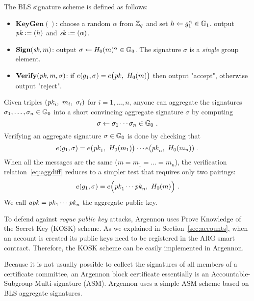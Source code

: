 The BLS signature scheme is defined as follows:

\begin{itemize}
    \item $\textbf{KeyGen}()$: choose a random $\alpha$ from $\mathbb{Z}_q$ and set $h \gets g_1^\alpha \in \mathbb{G}_1$.
    output $\mathit{pk} \mathrel{\mathop:}= (h)$ and $\mathit{sk} \mathrel{\mathop:}= (\alpha)$.
    \item $\textbf{Sign}(\mathit{sk}, m)$: output $\sigma \gets H_0(m)^\alpha \in \mathbb{G}_0$.
    The signature $\sigma$ is a \emph{single} group element.
    \item $\textbf{Verify}(\mathit{pk},m,\sigma)$: if $e(g_1, \sigma) = e\big(\PK,\ \Hm(m)\big)$  then output "accept",
    otherwise output "reject".
\end{itemize}

Given triples $(\PK_i,\ m_i,\ \sigma_i)$ for $i=1,\ldots,n$,
anyone can aggregate the signatures $\sigma_1,\ldots,\sigma_n \in \mathbb{G}_0$
into a short convincing aggregate signature $\sigma$ by computing
\begin{equation}
    \label{eq:agg}
    \sigma \gets \sigma_1 \cdots \sigma_n \in \mathbb{G}_0\ .
\end{equation}
Verifying an aggregate signature $\sigma \in \mathbb{G}_0$ is done by checking that
\begin{equation}
    \label{eq:aggdiff}
    e(g_1, \sigma) = e\big(\PK_1,\ \Hm(m_1)\big) \cdots e\big(\PK_n,\ \Hm(m_n)\big)\ .
\end{equation}
When all the messages are the same ($m = m_1 = \ldots = m_n$), the verification relation~\eqref{eq:aggdiff} reduces to
a simpler test that requires only two pairings:
\begin{equation}
    \label{eq:aggsame}
    e(g_1, \sigma) = e\Big(\mathit{pk}_1 \cdots \mathit{pk}_n,\ H_0(m)\Big)\ .
\end{equation}
We call $\mathit{apk}=\mathit{pk}_1 \cdots \mathit{pk}_n$ the aggregate public key.

To defend against \emph{rogue public key} attacks, Argennon uses Prove Knowledge of the Secret Key (KOSK) scheme. As we
explained in Section~\ref{sec:accounts}, when an account is created its public keys need to be registered in
the ARG smart contract. Therefore, the KOSK scheme can be easily implemented in Argennon.

Because it is not usually possible to collect the signatures of all members of a certificate committee, an Argennon
block certificate essentially is an Accountable-Subgroup Multi-signature (ASM). Argennon uses a simple ASM scheme
based on BLS aggregate signatures.

